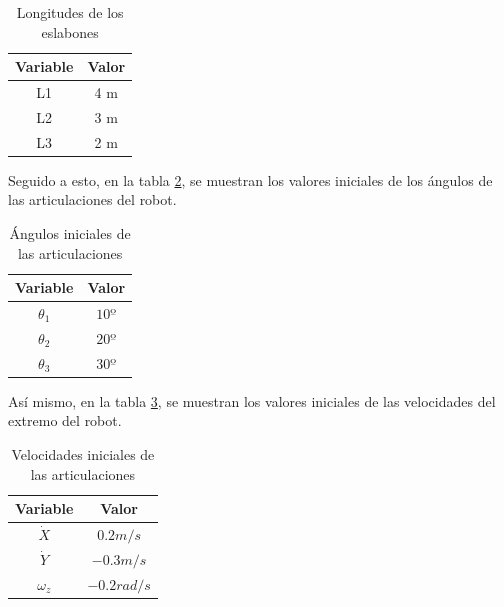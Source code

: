 \documentclass[11pt]{report} %
\begin{document}
	\begin{table}[]
		\centering
		\begin{tabular}{|c|c|}
			\hline
			\textbf{Variable} & \textbf{Valor} \\ \hline
			L1                & 4 m                     \\ \hline
			L2                & 3 m                     \\ \hline
			L3                & 2 m                     \\ \hline
		\end{tabular}
		\caption{Longitudes de los eslabones}
		\label{Tabla: Longitudes}
	\end{table}

	Seguido a esto, en la tabla \ref{Tabla: Angulos}, se muestran los valores iniciales de los ángulos de las articulaciones del robot.

	\begin{table}[]
		\centering
		\begin{tabular}{|c|c|}
			\hline
			\textbf{Variable} & \textbf{Valor} \\ \hline
			${\theta}_{1}$    & $10º$                  \\ \hline
			${\theta}_{2}$    & $20º$                  \\ \hline
			${\theta}_{3}$    & $30º$                  \\ \hline
		\end{tabular}
		\caption{Ángulos iniciales de las articulaciones}
		\label{Tabla: Angulos}
	\end{table}

	Así mismo, en la tabla \ref{Tabla: Velocidades}, se muestran los valores iniciales de las velocidades del extremo del robot.

	\begin{table}[]
		\centering
		\begin{tabular}{|c|c|}
			\hline
			\textbf{Variable}  & \textbf{Valor}  \\ \hline
			$\dot{X}$          & $0.2  m/s  $    \\ \hline
			$\dot{Y}$          & $-0.3 m/s  $    \\ \hline
			${\omega}_{z}$     & $-0.2 rad/s$    \\ \hline
		\end{tabular}
		\caption{Velocidades iniciales de las articulaciones}
		\label{Tabla: Velocidades}
	\end{table}
\end{document}
